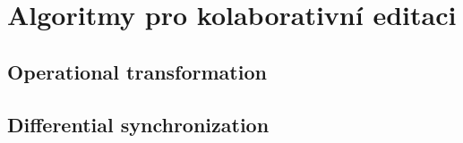 
\section{Algoritmy pro kolaborativní editaci}\label{sec:algoritmyProKolaborativníEditaci}
\subsection{Operational transformation}\label{subsec:operationalTransformation}
\subsection{Differential synchronization}\label{subsec:differentialSynchronization}
